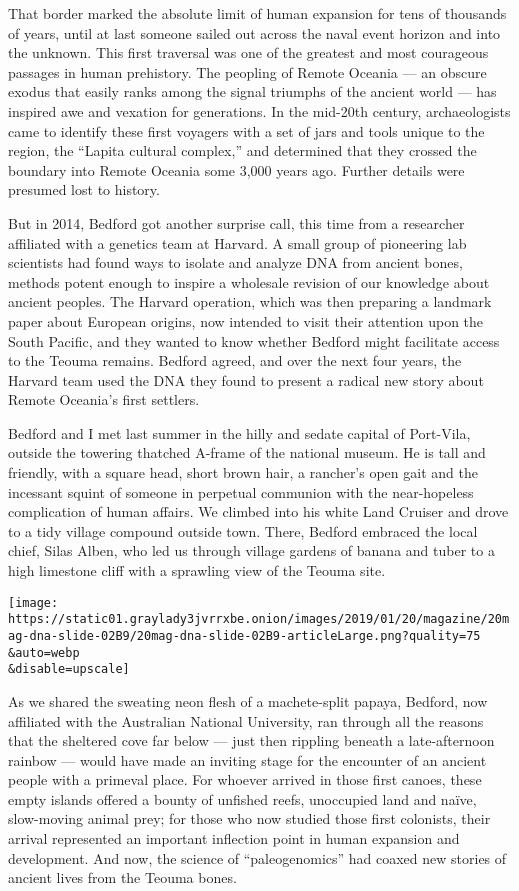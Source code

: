 That border marked the absolute limit of human expansion for tens of
thousands of years, until at last someone sailed out across the naval
event horizon and into the unknown. This first traversal was one of the
greatest and most courageous passages in human prehistory. The peopling
of Remote Oceania --- an obscure exodus that easily ranks among the
signal triumphs of the ancient world --- has inspired awe and vexation
for generations. In the mid-20th century, archaeologists came to
identify these first voyagers with a set of jars and tools unique to the
region, the ``Lapita cultural complex,'' and determined that they
crossed the boundary into Remote Oceania some 3,000 years ago. Further
details were presumed lost to history.

But in 2014, Bedford got another surprise call, this time from a
researcher affiliated with a genetics team at Harvard. A small group of
pioneering lab scientists had found ways to isolate and analyze DNA from
ancient bones, methods potent enough to inspire a wholesale revision of
our knowledge about ancient peoples. The Harvard operation, which was
then preparing a landmark paper about European origins, now intended to
visit their attention upon the South Pacific, and they wanted to know
whether Bedford might facilitate access to the Teouma remains. Bedford
agreed, and over the next four years, the Harvard team used the DNA they
found to present a radical new story about Remote Oceania's first
settlers.

Bedford and I met last summer in the hilly and sedate capital of
Port-Vila, outside the towering thatched A-frame of the national museum.
He is tall and friendly, with a square head, short brown hair, a
rancher's open gait and the incessant squint of someone in perpetual
communion with the near-hopeless complication of human affairs. We
climbed into his white Land Cruiser and drove to a tidy village compound
outside town. There, Bedford embraced the local chief, Silas Alben, who
led us through village gardens of banana and tuber to a high limestone
cliff with a sprawling view of the Teouma site.

\texttt{[image: https://static01.graylady3jvrrxbe.onion/images/2019/01/20/magazine/20mag-dna-slide-02B9/20mag-dna-slide-02B9-articleLarge.png?quality=75\\\&auto=webp\\\&disable=upscale]}

As we shared the sweating neon flesh of a machete-split papaya, Bedford,
now affiliated with the Australian National University, ran through all
the reasons that the sheltered cove far below --- just then rippling
beneath a late-afternoon rainbow --- would have made an inviting stage
for the encounter of an ancient people with a primeval place. For
whoever arrived in those first canoes, these empty islands offered a
bounty of unfished reefs, unoccupied land and naïve, slow-moving animal
prey; for those who now studied those first colonists, their arrival
represented an important inflection point in human expansion and
development. And now, the science of ``paleogenomics'' had coaxed new
stories of ancient lives from the Teouma bones.

